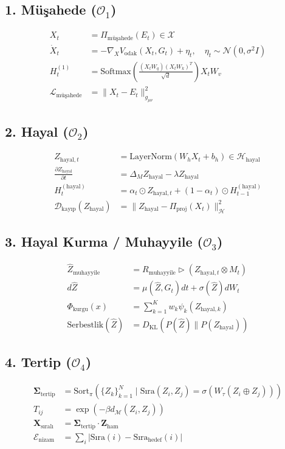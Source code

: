 \documentclass[11pt, a4paper]{article}
\begin{document}
\subsection{1. Müşahede ($\mathcal{O}_1$)}
\begin{align}
X_t &= \Pi_{\text{müşahede}}(E_t) \in \mathcal{X} \\
\dot{X}_t &= -\nabla_{X} V_{\text{odak}}(X_t, G_t) + \eta_t, \quad \eta_t \sim \mathcal{N}(0, \sigma^2 I) \\
H_t^{(1)} &= \text{Softmax}\left(\frac{(X_t W_q)(X_t W_k)^T}{\sqrt{d}}\right) X_t W_v \\
\mathcal{L}_{\text{müşahede}} &= \| X_t - E_t \|_{g_{\mu\nu}}^2
\end{align}

\subsection{2. Hayal ($\mathcal{O}_2$)}
\begin{align}
Z_{\text{hayal}, t} &= \text{LayerNorm}(W_h X_t + b_h) \in \mathcal{H}_{\text{hayal}} \\
\frac{\partial Z_{\text{hayal}}}{\partial t} &= \Delta_M Z_{\text{hayal}} - \lambda Z_{\text{hayal}} \\
H_t^{(\text{hayal})} &= \alpha_t \odot Z_{\text{hayal}, t} + (1-\alpha_t) \odot H_{t-1}^{(\text{hayal})} \\
\mathcal{D}_{\text{kayıp}}(Z_{\text{hayal}}) &= \| Z_{\text{hayal}} - \Pi_{\text{proj}}(X_t) \|_{\mathcal{H}}^2
\end{align}

\subsection{3. Hayal Kurma / Muhayyile ($\mathcal{O}_3$)}
\begin{align}
\hat{Z}_{\text{muhayyile}} &= R_{\text{muhayyile}} \triangleright \left( Z_{\text{hayal}, t} \otimes M_t \right) \\
d\hat{Z} &= \mu(\hat{Z}, G_t)dt + \sigma(\hat{Z}) dW_t \\
\Phi_{\text{kurgu}}(x) &= \sum_{k=1}^K w_k \psi_k(Z_{\text{hayal}, k}) \\
\text{Serbestlik}(\hat{Z}) &= D_{\text{KL}}\left(P(\hat{Z}) \parallel P(Z_{\text{hayal}})\right)
\end{align}

\subsection{4. Tertip ($\mathcal{O}_4$)}
\begin{align}
\mathbf{\Sigma}_{\text{tertip}} &= \text{Sort}_{\pi}\left( \{Z_k\}_{k=1}^N \mid \text{Sıra}(Z_i, Z_j) = \sigma(W_\tau (Z_i \oplus Z_j)) \right) \\
T_{ij} &= \exp\left( -\beta d_{\mathcal{M}}(Z_i, Z_j) \right) \\
\mathbf{X}_{\text{sıralı}} &= \mathbf{\Sigma}_{\text{tertip}} \cdot \mathbf{Z}_{\text{ham}} \\
\mathcal{E}_{\text{nizam}} &= \sum_{i} |\text{Sıra}(i) - \text{Sıra}_{\text{hedef}}(i)|
\end{align}
\end{document}
